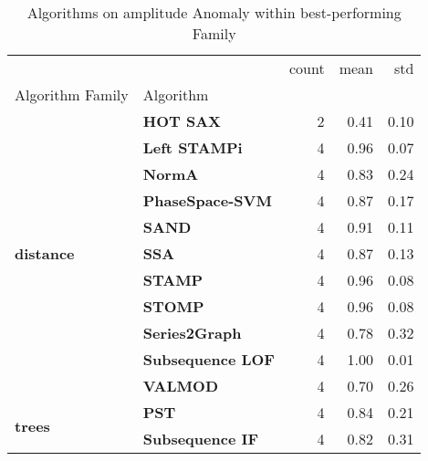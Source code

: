 \begin{table}
\caption{Algorithms on amplitude Anomaly within best-performing Family}
\label{tab:bp-amplitude}
\begin{tabular}{llrrr}
\toprule
 &  & count & mean & std \\
Algorithm Family & Algorithm &  &  &  \\
\midrule
\multirow[t]{11}{*}{\textbf{distance}} & \textbf{HOT SAX} & 2 & 0.41 & 0.10 \\
\textbf{} & \textbf{Left STAMPi} & 4 & 0.96 & 0.07 \\
\textbf{} & \textbf{NormA} & 4 & 0.83 & 0.24 \\
\textbf{} & \textbf{PhaseSpace-SVM} & 4 & 0.87 & 0.17 \\
\textbf{} & \textbf{SAND} & 4 & 0.91 & 0.11 \\
\textbf{} & \textbf{SSA} & 4 & 0.87 & 0.13 \\
\textbf{} & \textbf{STAMP} & 4 & 0.96 & 0.08 \\
\textbf{} & \textbf{STOMP} & 4 & 0.96 & 0.08 \\
\textbf{} & \textbf{Series2Graph} & 4 & 0.78 & 0.32 \\
\textbf{} & \textbf{Subsequence LOF} & 4 & 1.00 & 0.01 \\
\textbf{} & \textbf{VALMOD} & 4 & 0.70 & 0.26 \\
\cline{1-5}
\multirow[t]{2}{*}{\textbf{trees}} & \textbf{PST} & 4 & 0.84 & 0.21 \\
\textbf{} & \textbf{Subsequence IF} & 4 & 0.82 & 0.31 \\
\cline{1-5}
\bottomrule
\end{tabular}
\end{table}
